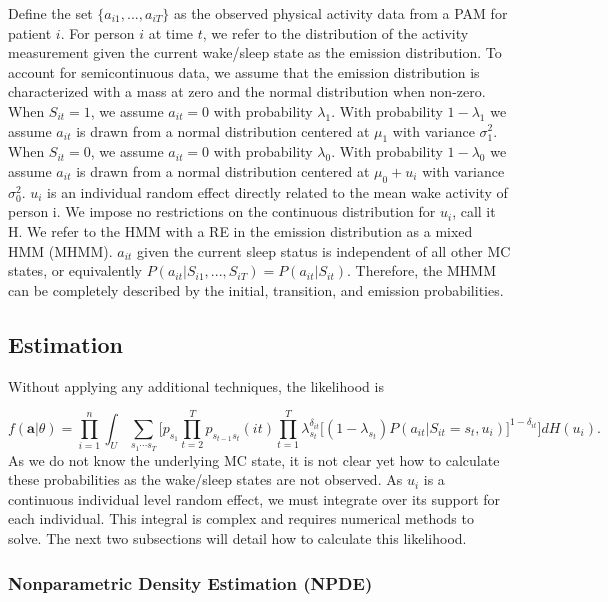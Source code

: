 \documentclass{article}
\begin{document}
Define the set $\{a_{i1}, ..., a_{iT}\}$ as the observed physical activity data from a PAM for patient $i$. For person $i$ at time $t$, we refer to the distribution of the activity measurement given the current wake/sleep state as the emission distribution. To account for semicontinuous data, we assume that the emission distribution is characterized with a mass at zero and the normal distribution when non-zero. When $S_{it}=1$, we assume $a_{it} = 0$ with probability $\lambda_1$. With probability $1-\lambda_1$ we assume $a_{it}$ is drawn from a normal distribution centered at $\mu_1$ with variance $\sigma_1^2$. When $S_{it}=0$, we assume $a_{it} = 0$ with probability $\lambda_0$. With probability $1 - \lambda_0$ we assume $a_{it}$ is drawn from a normal distribution centered at $\mu_0+u_i$ with variance $\sigma_0^2$. $u_i$ is an individual random effect directly related to the mean wake activity of person i. We impose no restrictions on the continuous distribution for $u_i$, call it H. We refer to the HMM with a RE in the emission distribution as a mixed HMM (MHMM). $a_{it}$ given the current sleep status is independent of all other MC states, or equivalently $P(a_{it}|S_{i1}, ..., S_{iT}) = P(a_{it}|S_{it})$. Therefore, the MHMM can be completely described by the initial, transition, and emission probabilities.
 
\subsection{Estimation}

Without applying any additional techniques, the likelihood is 

\begin{equation*}
f(\textbf{a}|\theta) = \prod_{i=1}^n \int_U \sum_{{s_1}\cdots{s_T}} \biggr[ 
    p_{s_1} \prod_{t=2}^T p_{s_{t-1}s_t}(it) \prod_{t=1}^T \lambda_{s_t}^{\delta_{it}} \big[(1-\lambda_{s_t})P(a_{it}|S_{it}=s_t,u_i)\big]^{1-\delta_{it}}\biggr] dH(u_i).
\end{equation*}
As we do not know the underlying MC state, it is not clear yet how to calculate these probabilities as the wake/sleep states are not observed. As $u_i$ is a continuous individual level random effect, we must integrate over its support for each individual. This integral is complex and requires numerical methods to solve. The next two subsections will detail how to calculate this likelihood. 



\subsubsection{Nonparametric Density Estimation (NPDE)}
\end{document}
